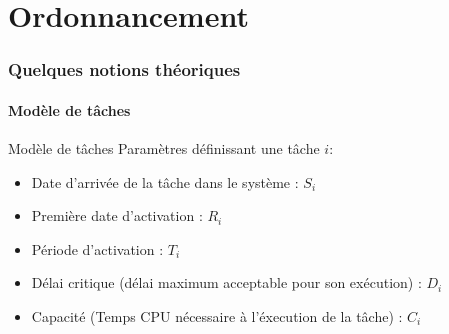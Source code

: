 %                                                                                                                       
%
%


\part{Ordonnancement}

\section{Quelques notions théoriques}

\subsection{Modèle de tâches}

\begin{frame}{Modèle de tâches}
  Paramètres définissant une tâche $i$:
  \begin{itemize}
    \item Date d'arrivée de la tâche dans le système : $S_i$
    \item Première date d'activation : $R_i$
    \item Période d'activation : $T_i$
    \item Délai critique (délai maximum acceptable pour son exécution)
      : $D_i$
    \item Capacité (Temps CPU nécessaire à l'éxecution de la tâche) :
      $C_i$
  \end{itemize}
\end{frame}

